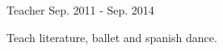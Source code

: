 

\begin{cventries}

  \cventry
    {Teacher} %
    {} %
    {} %
    {Sep. 2011 - Sep. 2014} %
    {
      \begin{cvitems} %
        \item {Teach literature, ballet and spanish dance.}
      \end{cvitems}
    }

\end{cventries}
